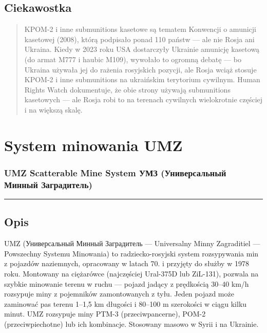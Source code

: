\documentclass[12pt,openany,oneside]{book}
\begin{document}
\section{Ciekawostka}\label{ciekawostka-117}

\begin{quote}
KPOM-2 i inne submunitions kasetowe są tematem Konwencji o amunicji
kasetowej (2008), którą podpisało ponad 110 państw --- ale nie Rosja ani
Ukraina. Kiedy w 2023 roku USA dostarczyły Ukrainie amunicję kasetową
(do armat M777 i haubic M109), wywołało to ogromną debatę --- bo Ukraina
używała jej do rażenia rosyjskich pozycji, ale Rosja wciąż stosuje
KPOM-2 i inne submunitions na ukraińskim terytorium cywilnym. Human
Rights Watch dokumentuje, że obie strony używają submunitions kasetowych
--- ale Rosja robi to na terenach cywilnych wielokrotnie częściej i na
większą skalę.
\end{quote}

\chapter{System minowania UMZ}\label{system-minowania-umz}

\subsection{UMZ Scatterable Mine System \textbar{} УМЗ (Универсальный
Минный
Заградитель)}\label{umz-scatterable-mine-system-ux443ux43cux437-ux443ux43dux438ux432ux435ux440ux441ux430ux43bux44cux43dux44bux439-ux43cux438ux43dux43dux44bux439-ux437ux430ux433ux440ux430ux434ux438ux442ux435ux43bux44c}

\begin{center}\rule{0.5\linewidth}{0.5pt}\end{center}

\section{Opis}\label{opis-118}

UMZ (Универсальный Минный Заградитель --- Universalny Minny Zagraditiel
--- Powszechny Systemu Minowania) to radziecko-rosyjski system
rozsypywania min z pojazdów naziemnych, opracowany w latach 70. i
przyjęty do służby w 1978 roku. Montowany na ciężarówce (najczęściej
Ural-375D lub ZiL-131), pozwala na szybkie minowanie terenu w ruchu ---
pojazd jadący z prędkością 30--40 km/h rozsypuje miny z pojemników
zamontowanych z tyłu. Jeden pojazd może zaminować pas terenu 1--1,5 km
długości i 80--100 m szerokości w ciągu kilku minut. UMZ rozsypuje miny
PTM-3 (przeciwpancerne), POM-2 (przeciwpiechotne) lub ich kombinacje.
Stosowany masowo w Syrii i na Ukrainie.
\end{document}
